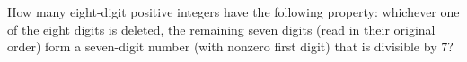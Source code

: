 How many eight-digit positive integers have the following property: whichever one of the eight digits is deleted, the remaining seven digits (read in their original order) form a seven-digit number (with nonzero first digit) that is divisible by $7$?
